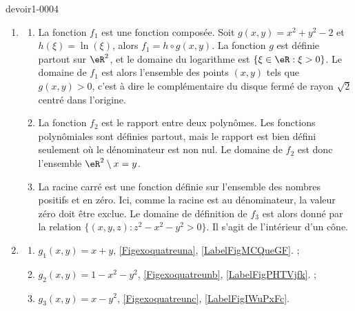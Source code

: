 \begin{corrige}{devoir1-0004}
  \begin{enumerate}
  \item 
    \begin{enumerate}
    \item  La fonction $f_1$ est une fonction composée. Soit $g(x,y)=x^2+y^2-2$ et $h(\xi)=\ln(\xi)$, alors $f_1=h\circ g (x,y)$. La fonction $g$ est définie partout sur $\eR^2$, et le domaine du logarithme est $\{\xi\in\eR : \xi>0\}$. Le domaine de $f_1$ est alors l'ensemble des points $(x,y)$ tels que $g(x,y)>0$, c'est à dire le complémentaire du disque fermé de rayon $\sqrt{2}$ centré dans l'origine. 
 
    \item  La fonction $f_2$ est le rapport entre deux polynômes. Les fonctions polynômiales sont définies partout, mais le rapport est bien défini seulement où le dénominateur est non nul. Le domaine de $f_2$ est donc l'ensemble $\eR^2\setminus {x=y}$. 

    \item  La racine carré est une fonction définie sur l'ensemble des nombres positifs et en zéro. Ici, comme la racine est au dénominateur, la valeur zéro doit être exclue. Le domaine de définition de $f_3$ est alors donné par la relation $\{(x,y,z) : z^2-x^2-y^2 >0\}$. Il s'agit de l'intérieur d'un cône.   

    \end{enumerate}
  
  \item 

    \begin{enumerate}
    \item   $\displaystyle g_1(x,y)= x+y$, \ref{Figexoquatreuna}, \ref{LabelFigMCQueGF}. ;
    \item   $\displaystyle g_2(x,y)= 1-x^2-y^2$, \ref{Figexoquatreunb}, \ref{LabelFigPHTVjfk}. ;
    \item   $\displaystyle g_3(x,y)= x-y^2$, \ref{Figexoquatreunc}, \ref{LabelFigIWuPxFc}.
    \end{enumerate}
  \end{enumerate}



\newcommand{\CaptionFigMCQueGF}{}


\newcommand{\CaptionFigPHTVjfk}{}



\end{corrige}

